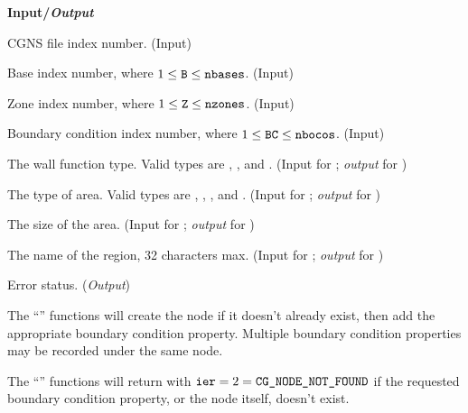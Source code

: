 \noindent
\textbf{\textcolor{input}{Input}/\textcolor{output}{\textit{Output}}}

\begin{Ventryi}{}\raggedright
\item [\fort{fn}]
      CGNS file index number.
      (\textcolor{input}{Input})
\item [\fort{B}]
      Base index number, where $1 \leq \text{{\normalfont\texttt{B}}} \leq \text{{\normalfont\texttt{nbases}}}$.
      (\textcolor{input}{Input})
\item [\fort{Z}]
      Zone index number, where $1 \leq \text{{\normalfont\texttt{Z}}} \leq \text{{\normalfont\texttt{nzones}}}$.
      (\textcolor{input}{Input})
\item [\fort{BC}]
      Boundary condition index number, where $1 \leq \text{{\normalfont\texttt{BC}}} \leq \text{{\normalfont\texttt{nbocos}}}$.
      (\textcolor{input}{Input})
\item [\fort{WallFunctionType}]
      The wall function type.
      Valid types are , , and .
      (\textcolor{input}{Input} for ;
      \textcolor{output}{\textit{output}} for
      )
\item [\fort{AreaType}]
      The type of area.
      Valid types are , , ,
      and .
      (\textcolor{input}{Input} for ;
      \textcolor{output}{\textit{output}} for )
\item [\fort{SurfaceArea}]
      The size of the area.
      (\textcolor{input}{Input} for ;
      \textcolor{output}{\textit{output}} for )
\item [\fort{RegionName}]
      The name of the region, 32 characters max.
      (\textcolor{input}{Input} for ;
      \textcolor{output}{\textit{output}} for )
\item [\fort{ier}]
      Error status.
      (\textcolor{output}{\textit{Output}})
\end{Ventryi}

The ``'' functions will create the 
node if it doesn't already exist, then add the appropriate boundary
condition property.
Multiple boundary condition properties may be recorded under the same
 node.

The ``'' functions will return with $\text{{\normalfont\texttt{ier}}} = 2 =
\text{{\normalfont\texttt{CG\_NODE\_NOT\_FOUND}}}$ if the requested boundary condition
property, or the  node itself, doesn't exist.
